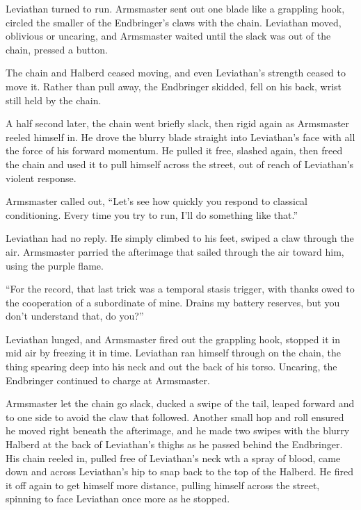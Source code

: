 Leviathan turned to run.  Armsmaster sent out one blade like a grappling hook, circled the smaller of the Endbringer's claws with the chain.  Leviathan moved, oblivious or uncaring, and Armsmaster waited until the slack was out of the chain, pressed a button.



The chain and Halberd ceased moving, and even Leviathan's strength ceased to move it.  Rather than pull away, the Endbringer skidded, fell on his back, wrist still held by the chain.



A half second later, the chain went briefly slack, then rigid again as Armsmaster reeled himself in. He drove the blurry blade straight into Leviathan's face with all the force of his forward momentum.  He pulled it free, slashed again, then freed the chain and used it to pull himself across the street, out of reach of Leviathan's violent response.



Armsmaster called out, ``Let's see how quickly you respond to classical conditioning.  Every time you try to run, I'll do something like that.''



Leviathan had no reply.  He simply climbed to his feet, swiped a claw through the air.  Armsmaster parried the afterimage that sailed through the air toward him, using the purple flame.



``For the record, that last trick was a temporal stasis trigger, with thanks owed to the cooperation of a subordinate of mine.  Drains my battery reserves, but you don't understand that, do you?''



Leviathan lunged, and Armsmaster fired out the grappling hook, stopped it in mid air by freezing it in time.  Leviathan ran himself through on the chain, the thing spearing deep into his neck and out the back of his torso.  Uncaring, the Endbringer continued to charge at Armsmaster.



Armsmaster let the chain go slack, ducked a swipe of the tail, leaped forward and to one side to avoid the claw that followed.  Another small hop and roll ensured he moved right beneath the afterimage, and he made two swipes with the blurry Halberd at the back of Leviathan's thighs as he passed behind the Endbringer.  His chain reeled in, pulled free of Leviathan's neck wth a spray of blood, came down and across Leviathan's hip to snap back to the top of the Halberd.  He fired it off again to get himself more distance, pulling himself across the street, spinning to face Leviathan once more as he stopped.



